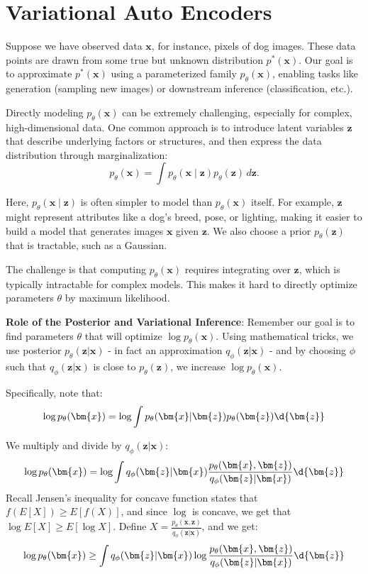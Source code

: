\documentclass{article}
\begin{document}
\section{Variational Auto Encoders}
\begin{remark}[Motivation] Suppose we have observed data \(\mathbf{x}\), for instance, pixels of dog images. These data points are drawn from some true but unknown distribution \(p^{\ast}(\mathbf{x})\). Our goal is to approximate $p ^{\ast}(\bm{x})$ using a parameterized family \(p_{\theta}(\mathbf{x})\), enabling tasks like generation (sampling new images) or downstream inference (classification, etc.).

Directly modeling \(p_{\theta}(\mathbf{x})\) can be extremely challenging, especially for complex, high-dimensional data. One common approach is to introduce latent variables \(\mathbf{z}\) that describe underlying factors or structures, and then express the data distribution through marginalization:
\[
p_{\theta}(\mathbf{x}) = \int p_{\theta}(\mathbf{x} \mid \mathbf{z}) p_{\theta}(\mathbf{z})\,d\mathbf{z}.
\]

Here, \(p_{\theta}(\mathbf{x}\mid\mathbf{z})\) is often simpler to model than \(p_{\theta}(\mathbf{x})\) itself. For example, \(\mathbf{z}\) might represent attributes like a dog's breed, pose, or lighting, making it easier to build a model that generates images \(\mathbf{x}\) given \(\mathbf{z}\). We also choose a prior \(p_{\theta}(\mathbf{z})\) that is tractable, such as a Gaussian.

The challenge is that computing \(p_{\theta}(\mathbf{x})\) requires integrating over \(\mathbf{z}\), which is typically intractable for complex models. This makes it hard to directly optimize parameters \(\theta\) by maximum likelihood.

\textbf{Role of the Posterior and Variational Inference}:
  Remember our goal is to find parameters $\theta$ that will optimize $\log p_{\theta}(\bm{x})$. Using mathematical tricks, we use posterior $p_{\theta}(\bm{z} | \bm{x})$ - in fact an approximation $q_{\phi}(\bm{z} | \bm{x})$ - and by choosing $\phi$ such that $q_{\phi}( \bm{z} | \bm{x})$ is close to $p_{\theta}(\bm{z})$, we increase $\log p_{\theta}(\bm{x})$. 

Specifically, note that:
\[
  \log p_{\theta}(\bm{x}) = \log \int p_{\theta}(\bm{x} | \bm{z}) p_{\theta}(\bm{z}) \d{\bm{z}}
\]

We multiply and divide by  $q_{\phi}(\bm{z} | \bm{x})$:
\[
  \log p_{\theta}(\bm{x}) = \log \int q_{\phi}(\bm{z} | \bm{x}) \frac{ p_{\theta}(\bm{x}, \bm{z})}{q_{\phi}(\bm{z} | \bm{x})} \d{\bm{z}}
\]
Recall Jensen's inequality for concave function states that $f(E[X]) \geq E[f(X)]$, and since $\log$ is concave, we get that $\log E[X] \geq E [\log X]$. Define $X = \frac{p_{\theta}(\bm{x}, \bm{z})}{q_{\phi}(\bm{z} | \bm{x})}$, and we get:
\[
  \log p_{\theta}(\bm{x}) \geq \int q_{\phi}(\bm{z} | \bm{x}) \log \frac{p_{\theta}(\bm{x}, \bm{z})}{q_{\phi}(\bm{z} | \bm{x})} \d{\bm{z}}
\]


\end{remark}
\end{document}
